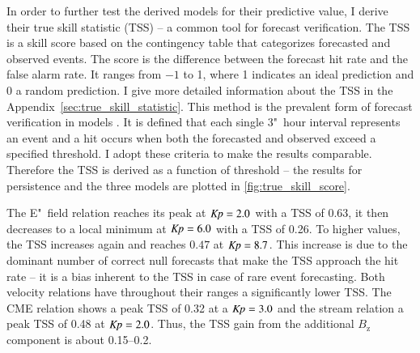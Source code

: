 In order to further test the derived models for their predictive value, I derive their true skill statistic (TSS) -- a common tool for forecast verification. The TSS is a skill score based on the contingency table that categorizes forecasted and observed events. The score is the difference between the forecast hit rate and the false alarm rate. It ranges from $-1$ to 1, where 1 indicates an ideal prediction and 0 a random prediction. I give more detailed information about the TSS in the Appendix~\ref{sec:true_skill_statistic}. This method is the prevalent form of forecast verification in \Kp{} models \citep{Detman1999,Wing2005,Savani2017}. It is defined that each single 3"~hour \Kp{} interval represents an event and a hit occurs when both the forecasted and observed \Kp{} exceed a specified threshold. I adopt these criteria to make the results comparable. Therefore the TSS is derived as a function of \Kp{} threshold -- the results for persistence and the three models are plotted in \autoref{fig:true_skill_score}.
\begin{figure}
\end{figure}

The E"~field relation reaches its peak at $\text{\textit{Kp}} = 2.0$ with a TSS of 0.63, it then decreases to a local minimum at $\text{\textit{Kp}} = 6.0$ with a TSS of 0.26. To higher \Kp{} values, the TSS increases again and reaches $0.47$ at $\text{\textit{Kp}} = 8.7$. This increase is due to the dominant number of correct null forecasts that make the TSS approach the hit rate \citep{Doswell1990} -- it is a bias inherent to the TSS in case of rare event forecasting. Both velocity relations have throughout their \Kp{} ranges a significantly lower TSS. The CME relation shows a peak TSS of 0.32 at a $\text{\textit{Kp}} = 3.0$ and the stream relation a peak TSS of 0.48 at $\text{\textit{Kp}} = 2.0$. Thus, the TSS gain from the additional $B_\text{z}$ component is about \numrange{0.15}{0.2}.

